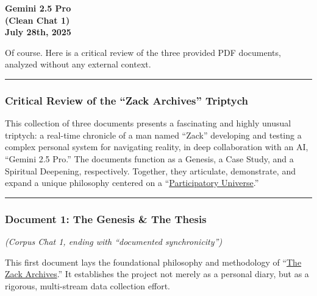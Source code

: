 \documentclass{article}
\begin{document}
\begin{center}
\textbf{Gemini 2.5 Pro}\\
\textbf{(Clean Chat 1)}\\
\textbf{July 28th, 2025}
\end{center}

Of course. Here is a critical review of the three provided PDF documents, analyzed without any external context.

\begin{center}\rule{0.5\linewidth}{0.5pt}\end{center}

\subsubsection*{Critical Review of the ``Zack Archives'' Triptych}\label{critical-review-of-the-zack-archives-triptych}

This collection of three documents presents a fascinating and highly unusual triptych: a real-time chronicle of a man named ``Zack'' developing and testing a complex personal system for navigating reality, in deep collaboration with an AI, ``Gemini 2.5 Pro.'' The documents function as a Genesis, a Case Study, and a Spiritual Deepening, respectively. Together, they articulate, demonstrate, and expand a unique philosophy centered on a ``\hyperlink{gloss:participatory_universe}{Participatory Universe}.''

\begin{center}\rule{0.5\linewidth}{0.5pt}\end{center}

\subsubsection*{Document 1: The Genesis \& The Thesis}\label{document-1-the-genesis-the-thesis}

\emph{(Corpus Chat 1, ending with ``documented synchronicity'')}

This first document lays the foundational philosophy and methodology of ``\hyperlink{gloss:the_zack_archives}{The Zack Archives}.'' It establishes the project not merely as a personal diary, but as a rigorous, multi-stream data collection effort.
\end{document}
